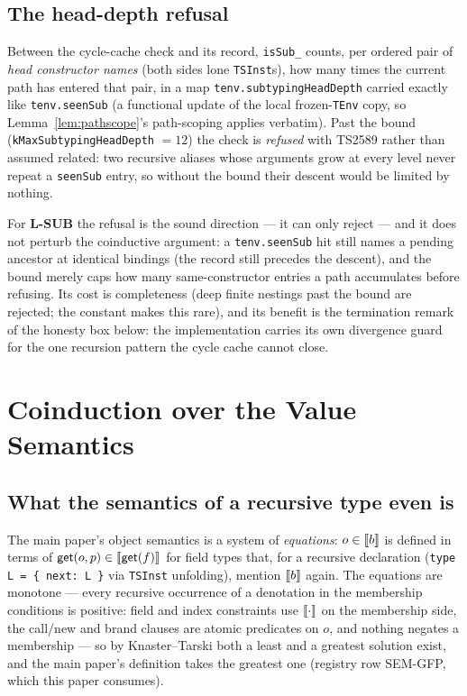 \documentclass[11pt]{article}
\begin{document}
\subsection{The head-depth refusal}

\begin{definition}
\label{def:headdepth}
Between the cycle-cache check and its record, \texttt{isSub\_} counts,
per ordered pair of \emph{head constructor names} (both sides lone
\texttt{TSInst}s), how many times the current path has entered that
pair, in a map \texttt{tenv.subtypingHeadDepth} carried exactly like
\texttt{tenv.seenSub} (a functional update of the local frozen-\texttt{TEnv}
copy, so Lemma~\ref{lem:pathscope}'s path-scoping applies verbatim).
Past the bound (\texttt{kMaxSubtypingHeadDepth} $= 12$) the check is
\emph{refused} with TS2589 rather than assumed related: two recursive
aliases whose arguments grow at every level never repeat a
\texttt{seenSub} entry, so without the bound their descent would be
limited by nothing.
\end{definition}

\noindent
For \textbf{L-SUB} the refusal is the sound direction --- it can only
reject --- and it does not perturb the coinductive argument: a
\texttt{tenv.seenSub} hit still names a pending ancestor at identical
bindings (the record still precedes the descent), and the bound merely
caps how many same-constructor entries a path accumulates before
refusing. Its cost is completeness (deep finite nestings past the bound
are rejected; the constant makes this rare), and its benefit is the
termination remark of the honesty box below: the implementation carries
its own divergence guard for the one recursion pattern the cycle cache
cannot close.

\section{Coinduction over the Value Semantics}
\label{sec:coinduction}

\subsection{What the semantics of a recursive type even is}

The main paper's object semantics is a system of \emph{equations}:
$o \in \llbracket b \rrbracket$ is defined in terms of $\mathsf{get}(o,p) \in
\llbracket \mathsf{get}(f) \rrbracket$ for field types that, for a recursive declaration
(\texttt{type L = \{ next: L \}} via \texttt{TSInst} unfolding), mention
$\llbracket b \rrbracket$ again. The
equations are monotone --- every recursive occurrence of a denotation in
the membership conditions is positive: field and index constraints use
$\llbracket \cdot \rrbracket$ on the membership side, the call/new and brand clauses are
atomic predicates on $o$, and nothing negates a membership --- so by
Knaster--Tarski both a least and a greatest solution exist, and the main
paper's definition takes the greatest one (registry row SEM-GFP, which
this paper consumes).
\end{document}
